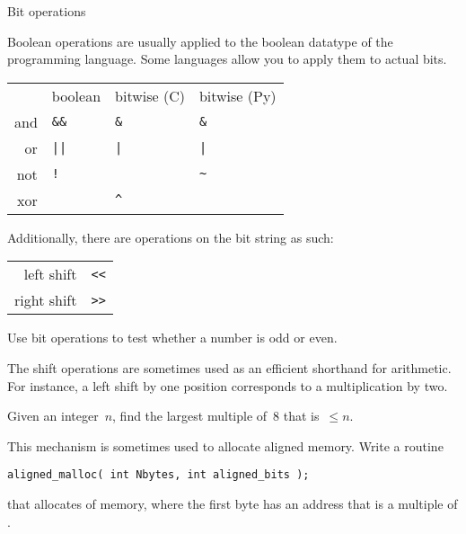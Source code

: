  {Bit operations}

Boolean operations are usually applied to the boolean datatype of the
programming language. Some languages allow you to apply them to actual
bits.

\begin{tabular}{|r|lll|}
  \midrule
  &boolean&bitwise (C)&bitwise (Py)\\
  and&\verb+&&+ & \verb+&+ & \verb+&+ \\
  or &\verb+||+ & \verb+|+ & \verb+|+ \\
  not&\verb+!+  &          & \verb+~+ \\
  xor&          & \verb+^+ &          \\
  \midrule
\end{tabular}

Additionally, there are operations on the bit string as such:

\begin{tabular}{|r|l|}
  \midrule
  left  shift& \verb+<<+ \\
  right shift& \verb+>>+ \\
  \midrule
\end{tabular}

\begin{exercise}
  \label{tutex:bit-even}
  Use bit operations to test whether a number is odd or even.
\end{exercise}

The shift operations are sometimes used as an efficient shorthand for
arithmetic. For instance, a left shift by one position corresponds to
a multiplication by two.

\begin{exercise}
  \label{ex:malloc_align}
  Given an integer~$n$, find the largest multiple of~8 that is~$\leq
  n$.

  This mechanism is sometimes used to allocate aligned memory.
  Write a routine
\begin{verbatim}
aligned_malloc( int Nbytes, int aligned_bits );
\end{verbatim}
  that allocates  of memory, where the first byte has an
  address that is a multiple of .
\end{exercise}

